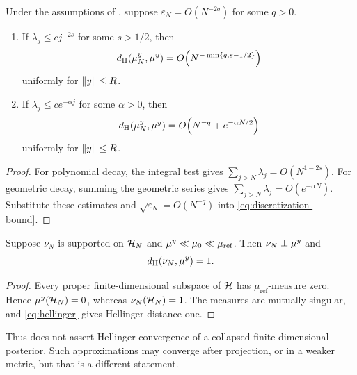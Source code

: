 \begin{corollary}
\label{cor:tail-rates}
Under the assumptions of , suppose
$\varepsilon_N=O(N^{-2q})$ for some $q>0$.
\begin{enumerate}
  \item If $\lambda_j\leq c j^{-2s}$ for some $s>1/2$, then
  \[
    {d_{\mathrm{H}}}({\mu^{y}_{N}},{\mu^{y}})
    =O\!\left(N^{-\min\{q,s-1/2\}}\right)
  \]
  uniformly for $\left\lVert y\right\rVert\leq R$.
  \item If $\lambda_j\leq c e^{-\alpha j}$ for some $\alpha>0$, then
  \[
    {d_{\mathrm{H}}}({\mu^{y}_{N}},{\mu^{y}})
    =O\!\left(N^{-q}+e^{-\alpha N/2}\right)
  \]
  uniformly for $\left\lVert y\right\rVert\leq R$.
\end{enumerate}
\end{corollary}

\begin{proof}
For polynomial decay, the integral test gives
$\sum_{j>N}\lambda_j=O(N^{1-2s})$.  For geometric decay, summing the
geometric series gives
$\sum_{j>N}\lambda_j=O(e^{-\alpha N})$.  Substitute these estimates
and $\sqrt{\varepsilon_N}=O(N^{-q})$ into
\eqref{eq:discretization-bound}.
\end{proof}

\begin{proposition}
\label{prop:singular-collapse}
Suppose $\nu_N$ is supported on $\mathcal{H}_N$ and ${\mu^{y}}\ll{\mu_{0}}\ll
\mu_{\mathrm{ref}}$.  Then $\nu_N\perp{\mu^{y}}$ and
\begin{equation}
  {d_{\mathrm{H}}}(\nu_N,{\mu^{y}})=1 .
\end{equation}
\end{proposition}

\begin{proof}
Every proper finite-dimensional subspace of $\mathcal{H}$ has
$\mu_{\mathrm{ref}}$-measure zero.  Hence
${\mu^{y}}(\mathcal{H}_N)=0$, whereas $\nu_N(\mathcal{H}_N)=1$.  The measures are mutually
singular, and \eqref{eq:hellinger} gives Hellinger distance one.
\end{proof}

Thus  does not assert Hellinger convergence of a
collapsed finite-dimensional posterior.  Such approximations may
converge after projection, or in a weaker metric, but that is a
different statement.
